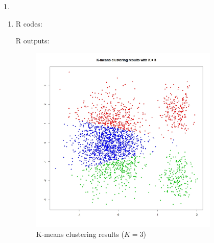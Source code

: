 \documentclass[10pt]{article}
\newtheorem{prob}{\bm{$Problem$}}
\begin{document}
\begin{prob}
\end{prob}
\begin{enumerate}[1)]
\vspace{3mm}

\item
R codes:

R outputs:

\begin{figure}[H]
  \centering
  \includegraphics[width=9cm,height=9cm]{p31a.jpeg}
  \caption{K-means clustering results ($K=3$)}
\end{figure}


\end{enumerate}
\end{document}
